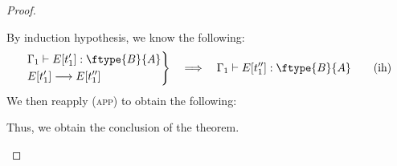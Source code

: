 \begin{proof}
\begin{itemize}
\begin{itemize}
By induction hypothesis, we know the following:
\begin{align*}
    \left.
    \begin{aligned}
        &\Gamma_1 \vdash E[t'_1] : \ftype{B}{A}\\
        &E[t'_1] \longrightarrow E[t''_1]
    \end{aligned}
    \right\}
    \hspace{1em}\Longrightarrow\hspace{1em}
    \Gamma_1 \vdash E[t''_1] : \ftype{B}{A}
    \tag{ih}
\end{align*}
We then reapply (\textsc{app}) to obtain the following:
\begin{center}
    \begin{minipage}{.70\linewidth}
    \end{minipage}
\end{center}
Thus, we obtain the conclusion of the theorem.\\
\end{itemize}



\end{itemize}
\end{proof}
